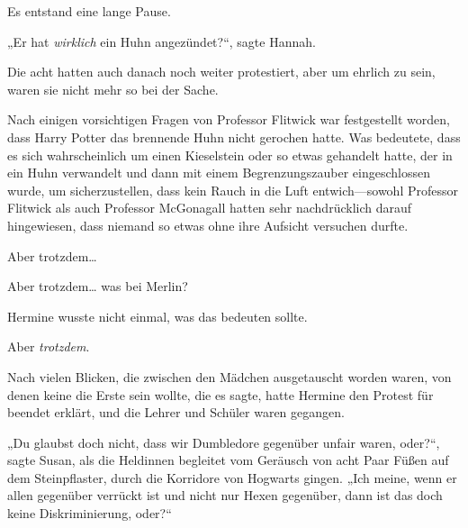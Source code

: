 Es entstand eine lange Pause.

„Er hat \emph{wirklich} ein Huhn angezündet?“, sagte Hannah.

\later

Die acht hatten auch danach noch weiter protestiert, aber um ehrlich zu sein, waren sie nicht mehr so bei der Sache.

Nach einigen vorsichtigen Fragen von Professor Flitwick war festgestellt worden, dass Harry Potter das brennende Huhn nicht gerochen hatte. Was bedeutete, dass es sich wahrscheinlich um einen Kieselstein oder so etwas gehandelt hatte, der in ein Huhn verwandelt und dann mit einem Begrenzungszauber eingeschlossen wurde, um sicherzustellen, dass kein Rauch in die Luft entwich—sowohl Professor Flitwick als auch Professor McGonagall hatten sehr nachdrücklich darauf hingewiesen, dass niemand so etwas ohne ihre Aufsicht versuchen durfte.

Aber trotzdem…

Aber trotzdem… was bei Merlin?

Hermine wusste nicht einmal, was das bedeuten sollte.

Aber \emph{trotzdem}.

Nach vielen Blicken, die zwischen den Mädchen ausgetauscht worden waren, von denen keine die Erste sein wollte, die es sagte, hatte Hermine den Protest für beendet erklärt, und die Lehrer und Schüler waren gegangen.

„Du glaubst doch nicht, dass wir Dumbledore gegenüber unfair waren, oder?“, sagte Susan, als die Heldinnen begleitet vom Geräusch von acht Paar Füßen auf dem Steinpflaster, durch die Korridore von Hogwarts gingen. „Ich meine, wenn er allen gegenüber verrückt ist und nicht nur Hexen gegenüber, dann ist das doch keine Diskriminierung, oder?“

